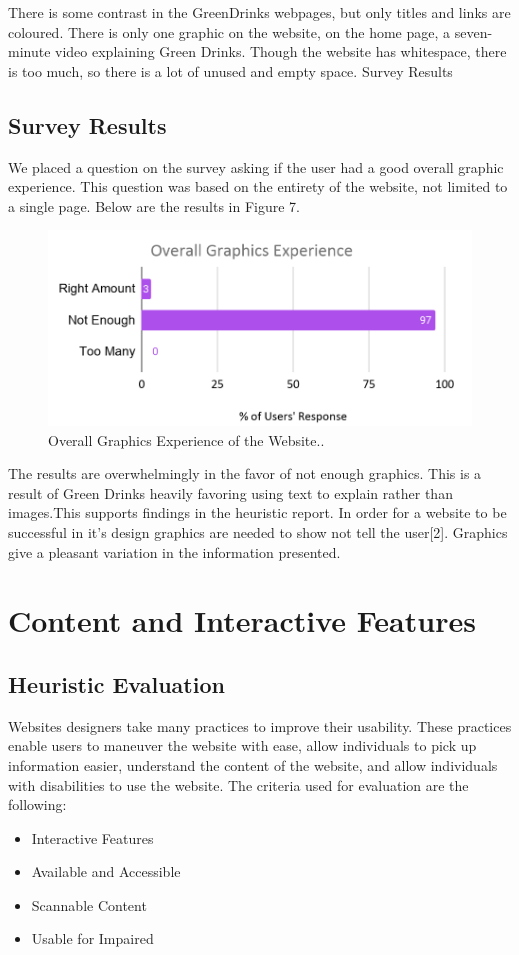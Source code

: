 \documentclass[12pt]{article}
\begin{document}
There is some contrast in the GreenDrinks webpages, but only titles and links are coloured. There is only one graphic on the website, on the home page, a seven-minute video explaining Green Drinks. Though the website has whitespace, there is too much, so there is a lot of unused and empty space.
Survey Results
\subsection{Survey Results}
We placed a question on the survey asking if the user had a good overall graphic experience. This question was based on the entirety of the website, not limited to a single page. Below are the results in Figure 7.

\begin{figure}[ht]
\centering
\includegraphics[width=1.0\textwidth]{f7}
\caption[Overall Graphics Experience of the Website.]{Overall Graphics Experience of the Website.\footnotemark.}
\end{figure}

The results are overwhelmingly in the favor of not enough graphics. This is a result of Green Drinks heavily favoring using text to explain rather than images.This supports findings in the heuristic report. In order for a website to be successful in it’s design graphics are needed to show not tell the user[2]. Graphics give a pleasant variation in the information presented.

\section{Content and Interactive Features}
\subsection{Heuristic Evaluation}
Websites designers take many practices to improve their usability. These practices enable users to maneuver the website with ease, allow individuals to pick up information easier, understand the content of the website, and allow individuals with disabilities to use the website. The criteria used for evaluation are the following:
\begin{itemize}
\item Interactive Features
\item Available and Accessible
\item	Scannable Content
\item	Usable for Impaired
\end{itemize}
\end{document}
